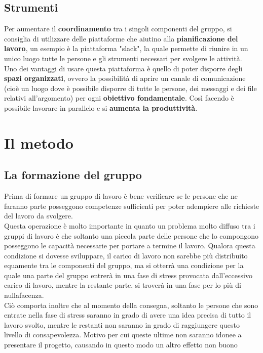 \documentclass[11pt,a4paper]{article}
\begin{document}
	\subsection{Strumenti}
	Per aumentare il \textbf{coordinamento} tra i singoli componenti del gruppo, si consiglia di utilizzare delle piattaforme che aiutino alla \textbf{pianificazione del lavoro}, un esempio è la piattaforma "slack", la quale permette di riunire in un unico luogo tutte le persone e gli strumenti necessari per svolgere le attività.\\
	Uno dei vantaggi di usare questa piattaforma è quello di poter disporre degli \textbf{spazi organizzati}, ovvero la possibilità di aprire un canale di comunicazione (cioè un luogo dove è possibile disporre di tutte le persone, dei messaggi e dei  file relativi all'argomento) per ogni \textbf{obiettivo fondamentale}. Così facendo è possibile lavorare in parallelo e si \textbf{aumenta la produttività}. 
	\newpage
	
	\section{Il metodo}
	\subsection{La formazione del gruppo}
	Prima di formare un gruppo di lavoro è bene verificare se le persone che ne faranno parte posseggono competenze sufficienti per poter adempiere alle richieste del lavoro da svolgere.\\
	Questa operazione è molto importante in quanto un problema molto diffuso tra i gruppi di lavoro è che soltanto una piccola parte delle persone che lo compongono posseggono le capacità necessarie per portare a termine il lavoro. Qualora questa condizione si dovesse sviluppare, il carico di lavoro non sarebbe più distribuito equamente tra le componenti del gruppo, ma si otterrà una condizione per la quale una parte del gruppo entrerà in una fase di stress provocata dall'eccessivo carico di lavoro, mentre la restante parte, si troverà in una fase per lo più di nullafacenza.\\
	Ciò comporta inoltre che al momento della consegna, soltanto le persone che sono entrate nella fase di stress saranno in grado di avere una idea precisa di tutto il lavoro svolto, mentre le restanti non saranno in grado di raggiungere questo livello di consapevolezza. Motivo per cui  queste ultime non saranno idonee a presentare il progetto, causando in questo modo un altro effetto non buono\\
	
\end{document}
